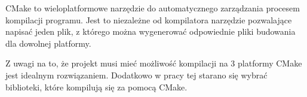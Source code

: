 \par
CMake to wieloplatformowe narzędzie do automatycznego zarządzania procesem kompilacji programu.
Jest to niezależne od kompilatora narzędzie pozwalające napisać jeden plik, z którego można wygenerować odpowiednie pliki budowania dla dowolnej platformy.
\par
Z uwagi na to, że projekt musi mieć możliwość kompilacji na 3 platformy CMake jest idealnym rozwiązaniem.
Dodatkowo w pracy tej starano się wybrać biblioteki, które kompilują się za pomocą CMake.